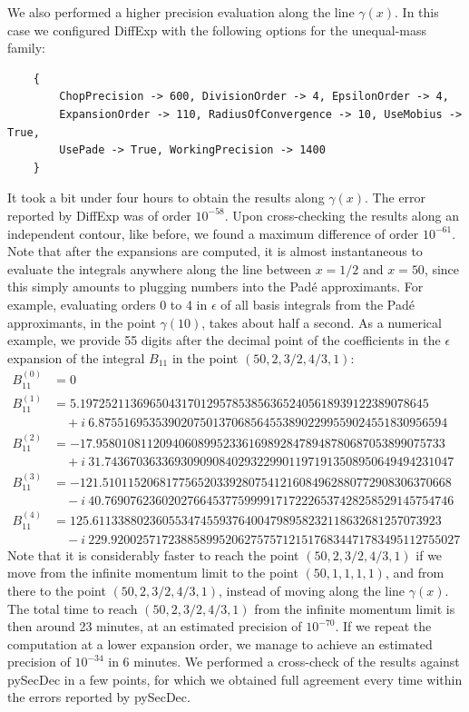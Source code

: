 \documentclass{article}
\begin{document}
We also performed a higher precision evaluation along the line $\gamma(x)$. In this case we configured DiffExp with the following options for the unequal-mass family:
\begin{verbatim}
    {
        ChopPrecision -> 600, DivisionOrder -> 4, EpsilonOrder -> 4,
        ExpansionOrder -> 110, RadiusOfConvergence -> 10, UseMobius -> True,
        UsePade -> True, WorkingPrecision -> 1400
    }
\end{verbatim}
It took a bit under four hours to obtain the results along $\gamma(x)$. The error reported by DiffExp was of order $10^{-58}$. Upon cross-checking the results along an independent contour, like before, we found a maximum difference of order $10^{-61}$. Note that after the expansions are computed, it is almost instantaneous to evaluate the integrals anywhere along the line between $x=1/2$ and $x=50$, since this simply amounts to plugging numbers into the Padé approximants. For example, evaluating orders 0 to 4 in $\epsilon$ of all basis integrals from the Padé approximants, in the point $\gamma(10)$, takes about half a second. As a numerical example, we provide 55 digits after the decimal point of the coefficients in the $\epsilon$ expansion of the integral $B_{11}$ in the point $(50,2,3/2,4/3,1)$:
\begin{align}
    B_{11}^{(0)} &= 0 \nonumber\\
    B_{11}^{(1)} &= 5.1972521136965043170129578538563652405618939122389078645 \nonumber\\&\quad + i~6.8755169535390207501370685645538902299559024551830956594 \nonumber\\
    B_{11}^{(2)} &= -17.9580108112094060899523361698928478948780687053899075733 \nonumber\\&\quad + i~31.7436703633693090908402932299011971913508950649494231047 \nonumber\\
    B_{11}^{(3)} &= -121.5101152068177565203392807541216084962880772908306370668 \nonumber\\&\quad - i~40.7690762360202766453775999917172226537428258529145754746 \nonumber\\
    B_{11}^{(4)} &= 125.6113388023605534745593764004798958232118632681257073923 \nonumber\\&\quad - i~229.9200257172388589952062757571215176834471783495112755027
\end{align}
Note that it is considerably faster to reach the point $(50,2,3/2,4/3,1)$ if we move from the infinite momentum limit to the point $(50,1,1,1,1)$, and from there to the point $(50,2,3/2,4/3,1)$, instead of moving along the line $\gamma(x)$. The total time to reach $(50,2,3/2,4/3,1)$ from the infinite momentum limit is then around 23 minutes, at an estimated precision of $10^{-70}$. If we repeat the computation at a lower expansion order, we manage to achieve an estimated precision of $10^{-34}$ in 6 minutes. We performed a cross-check of the results against pySecDec \cite{Borowka:2017idc} in a few points, for which we obtained full agreement every time within the errors reported by pySecDec.
\end{document}
